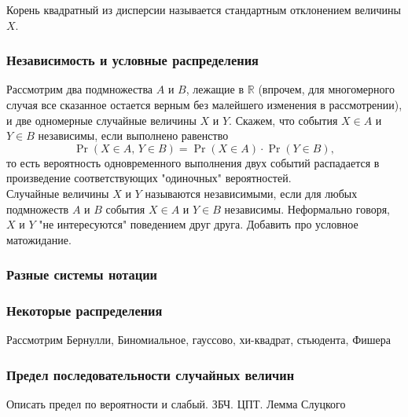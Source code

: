 \documentclass[12pt,a4paper]{book}
\begin{document}
Корень квадратный из дисперсии называется стандартным отклонением величины $X$.
\subsubsection{Независимость и условные распределения}
Рассмотрим два подмножества $A$ и $B$, лежащие в $\mathbb{R}$ (впрочем, для многомерного случая все сказанное остается верным без малейшего изменения в рассмотрении), и две одномерные случайные величины $X$ и $Y$. Скажем, что события $X \in A$ и $Y \in B$ независимы, если выполнено равенство
$$ \Pr \left( X \in A, \, Y \in B \right) = \Pr \left( X \in A \right) \cdot \Pr \left( Y \in B \right), $$
то есть вероятность одновременного выполнения двух событий распадается в произведение соответствующих "одиночных" вероятностей.\\

Случайные величины $X$ и $Y$ называются независимыми, если для любых подмножеств $A$ и $B$ события $X \in A$ и $Y \in B$ независимы. Неформально говоря, $X$ и $Y$ "не интересуются" поведением друг друга.
Добавить про условное матожидание.
\subsubsection{Разные системы нотации}
\subsubsection{Некоторые распределения}
Рассмотрим Бернулли, Биномиальное, гауссово, хи-квадрат, стьюдента, Фишера
\subsubsection{Предел последовательности случайных величин}
Описать предел по вероятности и слабый. ЗБЧ. ЦПТ. Лемма Слуцкого
\end{document}
